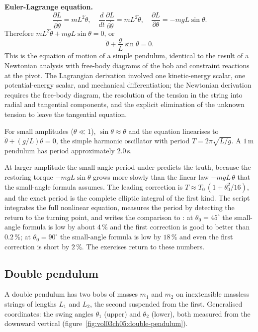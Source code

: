 \textbf{Euler-Lagrange equation.}
\[
\frac{\partial L}{\partial \dot{\theta}} = m L^2 \dot{\theta}, \quad
\frac{d}{dt}\frac{\partial L}{\partial \dot{\theta}} = m L^2
\ddot{\theta}, \quad \frac{\partial L}{\partial \theta} = -m g L
\sin\theta.
\]
Therefore $m L^2 \ddot{\theta} + m g L \sin\theta = 0$, or
\[
\ddot{\theta} + \frac{g}{L}\sin\theta = 0.
\]
This is the equation of motion of a simple pendulum, identical to
the result of a Newtonian analysis with free-body diagrams of the
bob and constraint reactions at the pivot. The Lagrangian derivation
involved one kinetic-energy scalar, one potential-energy scalar, and
mechanical differentiation; the Newtonian derivation requires the
free-body diagram, the resolution of the tension in the string into
radial and tangential components, and the explicit elimination of
the unknown tension to leave the tangential equation.

For small amplitudes ($\theta \ll 1$), $\sin\theta \approx \theta$ and
the equation linearises to $\ddot{\theta} + (g/L)\theta = 0$, the
simple harmonic oscillator with period $T = 2\pi\sqrt{L/g}$. A
$1\,\si{\meter}$ pendulum has period approximately $2.0\,\si{\second}$.

At larger amplitude the small-angle period under-predicts the truth,
because the restoring torque $-mgL\sin\theta$ grows more slowly than the
linear law $-mgL\,\theta$ that the small-angle formula assumes. The
leading correction is $T \approx T_0\,(1 + \theta_0^2/16)$, and the
exact period is the complete elliptic integral of the first kind. The
script  integrates the full nonlinear
equation, measures the period by detecting the return to the turning
point, and writes the comparison to : at
$\theta_0 = 45^\circ$ the small-angle formula is low by about
$4\,\%$ and the first correction is good to better than $0.2\,\%$;
at $\theta_0 = 90^\circ$ the small-angle formula is low by $18\,\%$
and even the first correction is short by $2\,\%$. The exercises return
to these numbers.

\subsection{Double pendulum}

A double pendulum has two bobs of masses $m_1$ and $m_2$ on
inextensible massless strings of lengths $L_1$ and $L_2$, the second
suspended from the first. Generalised coordinates: the swing angles
$\theta_1$ (upper) and $\theta_2$ (lower), both measured from the
downward vertical (figure~\ref{fig:vol03ch05:double-pendulum}).

